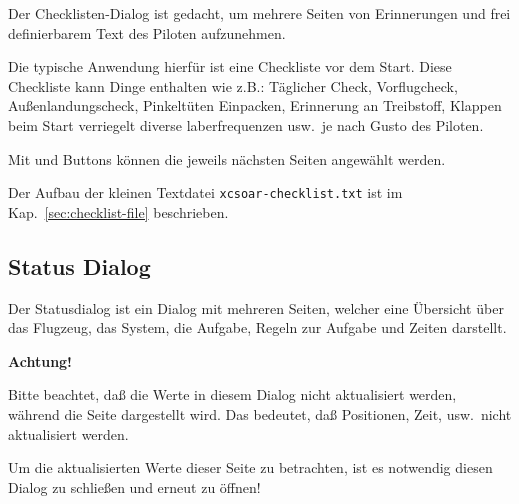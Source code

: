 Der Checklisten-Dialog ist gedacht, um mehrere Seiten von Erinnerungen 
 und 
frei definierbarem Text des Piloten aufzunehmen. 

Die typische Anwendung hierfür ist eine Checkliste vor dem Start. Diese Checkliste kann Dinge enthalten wie z.B.:
Täglicher Check, Vorflugcheck, Außenlandungscheck, Pinkeltüten Einpacken, Erinnerung an Treibstoff, 
Klappen beim Start verriegelt diverse laberfrequenzen usw.\ je nach Gusto des Piloten.  

Mit  \button{$<$} und \button{$>$} Buttons  können die jeweils nächsten Seiten angewählt werden.

Der Aufbau der kleinen Textdatei \verb|xcsoar-checklist.txt| ist im Kap.~\ref{sec:checklist-file} beschrieben. 


\subsection*{Status Dialog}
Der Statusdialog ist ein Dialog mit mehreren Seiten, welcher eine Übersicht über das Flugzeug, das System, die Aufgabe, Regeln zur Aufgabe und Zeiten darstellt. 

\textbf{Achtung!}

Bitte beachtet, daß die Werte in diesem Dialog nicht aktualisiert werden, während die Seite dargestellt wird.
Das bedeutet, daß Positionen, Zeit, usw.\ nicht aktualisiert werden. 

Um die aktualisierten Werte dieser Seite zu betrachten, ist es notwendig diesen Dialog zu schließen und erneut zu öffnen!  

